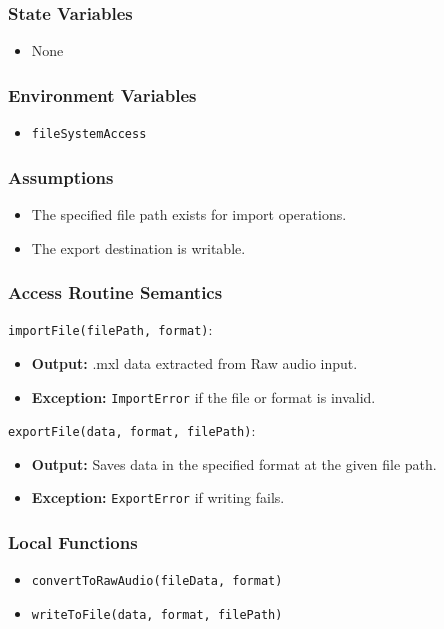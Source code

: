 \documentclass[12pt, titlepage]{article}
\begin{document}
\subsubsection{State Variables}  
\begin{itemize}  
    \item None  
\end{itemize}  

\subsubsection{Environment Variables}  
\begin{itemize}  
    \item \texttt{fileSystemAccess}  
\end{itemize}  

\subsubsection{Assumptions}  
\begin{itemize}  
    \item The specified file path exists for import operations.  
    \item The export destination is writable.  
\end{itemize}  

\subsubsection{Access Routine Semantics}  

\noindent \texttt{importFile(filePath, format)}:
\begin{itemize}  
    \item \textbf{Output:} .mxl data extracted from Raw audio input.  
    \item \textbf{Exception:} \texttt{ImportError} if the file or format is invalid.  
\end{itemize}  

\noindent \texttt{exportFile(data, format, filePath)}:
\begin{itemize}  
    \item \textbf{Output:} Saves data in the specified format at the given file path.  
    \item \textbf{Exception:} \texttt{ExportError} if writing fails.  
\end{itemize}  

\subsubsection{Local Functions}  
\begin{itemize}  
    \item \texttt{convertToRawAudio(fileData, format)}  
    \item \texttt{writeToFile(data, format, filePath)}  
\end{itemize}  
\end{document}
